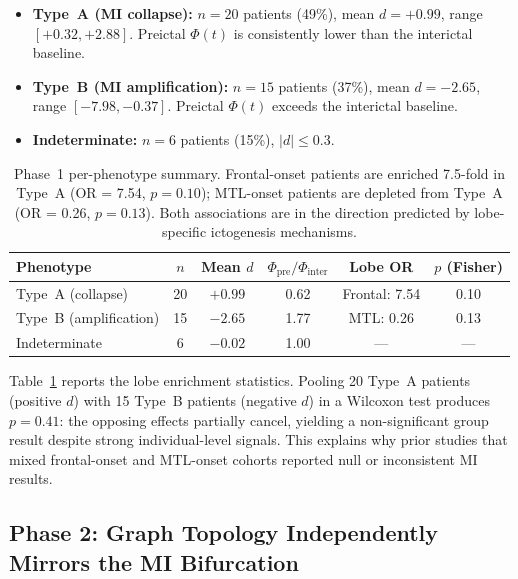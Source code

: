 \documentclass[final,5p,times,twocolumn]{elsarticle}
\begin{document}
\begin{itemize}
  \item \textbf{Type~A (MI collapse):} $n = 20$ patients (49\%),
        mean $d = +0.99$, range $[+0.32, +2.88]$.
        Preictal $\Phi(t)$ is consistently lower than the interictal
        baseline.

  \item \textbf{Type~B (MI amplification):} $n = 15$ patients
        (37\%), mean $d = -2.65$, range $[-7.98, -0.37]$.
        Preictal $\Phi(t)$ exceeds the interictal baseline.

  \item \textbf{Indeterminate:} $n = 6$ patients (15\%),
        $|d| \leq 0.3$.
\end{itemize}

\begin{table}[t]
  \centering
  \caption{Phase~1 per-phenotype summary.
           Frontal-onset patients are enriched 7.5-fold in Type~A
           (OR = 7.54, $p = 0.10$); MTL-onset patients are depleted
           from Type~A (OR = 0.26, $p = 0.13$).
           Both associations are in the direction predicted by lobe-specific
           ictogenesis mechanisms.}
  \label{tab:phase1}
  \begin{tabular}{lccccc}
    \toprule
    Phenotype & $n$ & Mean $d$ & $\Phi_\text{pre}/\Phi_\text{inter}$
              & Lobe OR & $p$ (Fisher) \\
    \midrule
    Type~A (collapse)       & 20 & $+0.99$ & 0.62
      & Frontal: 7.54 & 0.10 \\
    Type~B (amplification)  & 15 & $-2.65$ & 1.77
      & MTL: 0.26     & 0.13 \\
    Indeterminate           &  6 & $-0.02$ & 1.00
      & ---           & ---  \\
    \bottomrule
  \end{tabular}
\end{table}

Table~\ref{tab:phase1} reports the lobe enrichment statistics.
%
Pooling 20 Type~A patients (positive $d$) with 15 Type~B patients
(negative $d$) in a Wilcoxon test produces $p = 0.41$:
the opposing effects partially cancel, yielding a non-significant
group result despite strong individual-level signals.
%
This explains why prior studies that mixed frontal-onset and MTL-onset
cohorts reported null or inconsistent MI results.

\subsection{Phase 2: Graph Topology Independently Mirrors the MI Bifurcation}
\end{document}
